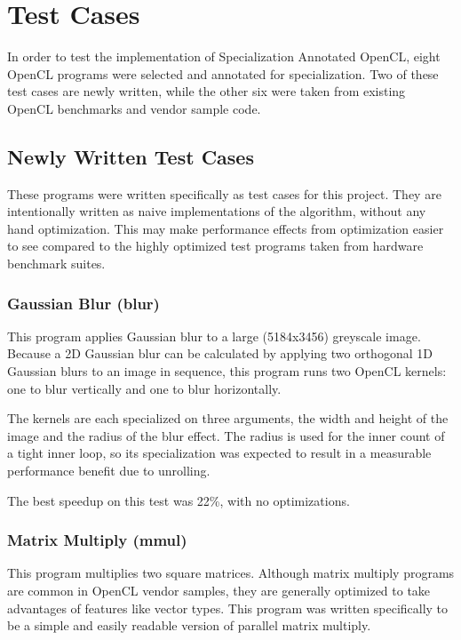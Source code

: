 \documentclass{acm_proc_article-sp}
\begin{document}
\section{Test Cases}
\label{test-cases}

In order to test the implementation of Specialization Annotated OpenCL, eight
OpenCL programs were selected and annotated for specialization. Two of these
test cases are newly written, while the other six were taken from existing
OpenCL benchmarks and vendor sample code.

\subsection{Newly Written Test Cases}

These programs were written specifically as test cases for this project. They
are intentionally written as naive implementations of the algorithm, without
any hand optimization. This may make performance effects from optimization
easier to see compared to the highly optimized test programs taken from
hardware benchmark suites.

\subsubsection{Gaussian Blur (blur)}

This program applies Gaussian blur to a large (5184x3456) greyscale image.
Because a 2D Gaussian blur can be calculated by applying two orthogonal 1D
Gaussian blurs to an image in sequence, this program runs two OpenCL kernels:
one to blur vertically and one to blur horizontally.

The kernels are each specialized on three arguments, the width and height of
the image and the radius of the blur effect. The radius is used for the inner
count of a tight inner loop, so its specialization was expected to result in a
measurable performance benefit due to unrolling.

The best speedup on this test was 22\%, with no optimizations.

\subsubsection{Matrix Multiply (mmul)}

This program multiplies two square matrices. Although matrix multiply programs
are common in OpenCL vendor samples, they are generally optimized to take
advantages of features like vector types. This program was written specifically
to be a simple and easily readable version of parallel matrix multiply.
\end{document}
